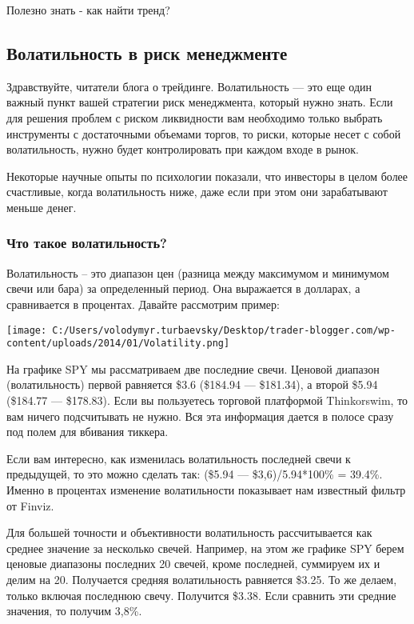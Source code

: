 \documentclass[a5paper]{article}
\begin{document}
Полезно знать - как найти тренд?

\subsection{Волатильность в риск менеджменте}

Здравствуйте, читатели блога о трейдинге. Волатильность — это еще один важный пункт вашей стратегии риск менеджмента, который нужно знать. Если для решения проблем с риском ликвидности вам необходимо только выбрать инструменты с достаточными объемами торгов, то риски, которые несет с собой волатильность, нужно будет контролировать при каждом входе в рынок.

Некоторые научные опыты по психологии показали, что инвесторы в целом
более счастливые, когда волатильность ниже, даже если при этом они
зарабатывают меньше денег.

\subsubsection{Что такое волатильность?}

Волатильность – это диапазон цен (разница между максимумом и минимумом
свечи или бара) за определенный период. Она выражается в долларах, а
сравнивается в процентах. Давайте рассмотрим пример:

\texttt{[image: C:/Users/volodymyr.turbaevsky/Desktop/trader-blogger.com/wp-content/uploads/2014/01/Volatility.png]}

На графике SPY мы рассматриваем две последние свечи. Ценовой диапазон (волатильность) первой равняется \$3.6 (\$184.94 — \$181.34), а второй \$5.94 (\$184.77 — \$178.83). Если вы пользуетесь торговой платформой Thinkorswim, то вам ничего подсчитывать не нужно. Вся эта информация дается в полосе сразу под полем для вбивания тиккера.

Если вам интересно, как изменилась волатильность последней свечи к предыдущей, то это можно сделать так: (\$5.94 — \$3,6)/5.94*100\% = 39.4\%. Именно в процентах изменение волатильности показывает нам известный фильтр от Finviz.

Для большей точности и объективности волатильность рассчитывается как
среднее значение за несколько свечей. Например, на этом же графике SPY
берем ценовые диапазоны последних 20 свечей, кроме последней,
суммируем их и делим на 20. Получается средняя волатильность равняется
\$3.25. То же делаем, только включая последнюю свечу. Получится
\$3.38. Если сравнить эти средние значения, то получим 3,8\%.
\end{document}

